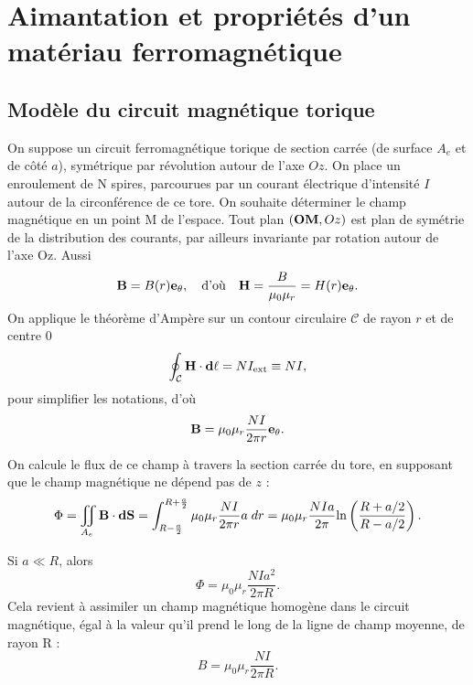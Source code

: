 \documentclass[11pt,a4paper]{report}
\begin{document}
\newpage
\section{Aimantation et propriétés d'un matériau ferromagnétique}

\subsection{Modèle du circuit magnétique torique}
On suppose un circuit ferromagnétique torique de section carrée (de surface $A_e$ et de côté $a$), symétrique par révolution autour de l'axe $Oz$. On place un enroulement de N spires, parcourues par un courant électrique d'intensité $I$ autour de la circonférence de ce tore. On souhaite déterminer le champ magnétique en un point M de l'espace. Tout plan $(\bold{OM},Oz)$ est plan de symétrie de la distribution des courants, par ailleurs invariante par rotation autour de l'axe Oz. Aussi
\begin{equation}
	\bold{B} = B(r) \bold{e}_\theta, \quad\text{d'où}\quad \bold{H} 
	= \frac{B}{\mu_0 \mu_r} = H(r) \bold{e}_\theta.
\end{equation}
On applique le théorème d'Ampère sur un contour circulaire $\mathcal{C}$ de rayon $r$ et de centre 0 
\begin{equation}
	\oint_\mathcal{C} \bold{H}\cdot\bold{d\ell} = NI_\text{ext} \equiv N I,
\end{equation}
pour simplifier les notations, d'où
\begin{equation}
	\bold{B} = \mu_0\mu_r \frac{NI}{2\pi r}\bold{e}_\theta.
\end{equation}

On calcule le flux de ce champ à travers la section carrée du tore, en supposant que le champ magnétique ne dépend pas de $z$ :
\begin{equation}
	\Phi = \iint_{A_e}\bold{B}\cdot\bold{dS} 
	= \int_{R - \frac{a}{2}}^{R+\frac{a}{2}} \mu_0\mu_r \frac{NI}{2\pi r}a\;dr
	= \mu_0\mu_r \frac{NIa}{2\pi}\text{ln}\left( \frac{R+a/2}{R-a/2}\right).
\end{equation}

Si $a \ll R$, alors
\begin{equation}
	\Phi = \mu_0 \mu_r \frac{NIa^2}{2\pi R}.
\end{equation}
Cela revient à assimiler un champ magnétique homogène dans le circuit magnétique, égal à la valeur qu'il prend le long de la ligne de champ moyenne, de rayon R :
\begin{equation}
	B = \mu_0\mu_r \frac{NI}{2\pi R}.
\end{equation}
\end{document}
